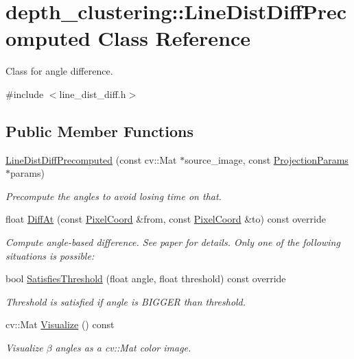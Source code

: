 \hypertarget{classdepth__clustering_1_1LineDistDiffPrecomputed}{\section{depth\-\_\-clustering\-:\-:Line\-Dist\-Diff\-Precomputed Class Reference}
\label{classdepth__clustering_1_1LineDistDiffPrecomputed}
}


Class for angle difference.  




{\ttfamily \#include $<$line\-\_\-dist\-\_\-diff.\-h$>$}

\subsection*{Public Member Functions}
\begin{DoxyCompactItemize}
\item 
\hyperlink{classdepth__clustering_1_1LineDistDiffPrecomputed_a035909e1718ad9b54b9b4116bbb6c408}{Line\-Dist\-Diff\-Precomputed} (const cv\-::\-Mat $\ast$source\-\_\-image, const \hyperlink{classdepth__clustering_1_1ProjectionParams}{Projection\-Params} $\ast$params)
\begin{DoxyCompactList}\small\item\em Precompute the angles to avoid losing time on that. \end{DoxyCompactList}\item 
float \hyperlink{classdepth__clustering_1_1LineDistDiffPrecomputed_ac505afaa537656af1bcc342ab1e910c4}{Diff\-At} (const \hyperlink{structdepth__clustering_1_1PixelCoord}{Pixel\-Coord} \&from, const \hyperlink{structdepth__clustering_1_1PixelCoord}{Pixel\-Coord} \&to) const override
\begin{DoxyCompactList}\small\item\em Compute angle-\/based difference. See paper for details. Only one of the following situations is possible\-: \end{DoxyCompactList}\item 
\hypertarget{classdepth__clustering_1_1LineDistDiffPrecomputed_ac3ce8196d5e6f49f3e3bdc3e3b32b033}{bool \hyperlink{classdepth__clustering_1_1LineDistDiffPrecomputed_ac3ce8196d5e6f49f3e3bdc3e3b32b033}{Satisfies\-Threshold} (float angle, float threshold) const override}\label{classdepth__clustering_1_1LineDistDiffPrecomputed_ac3ce8196d5e6f49f3e3bdc3e3b32b033}

\begin{DoxyCompactList}\small\item\em Threshold is satisfied if angle is B\-I\-G\-G\-E\-R than threshold. \end{DoxyCompactList}\item 
cv\-::\-Mat \hyperlink{classdepth__clustering_1_1LineDistDiffPrecomputed_ae06f8b4dd6330730849725c1b1f20b43}{Visualize} () const 
\begin{DoxyCompactList}\small\item\em Visualize $\beta$ angles as a {\ttfamily cv\-::\-Mat} color image. \end{DoxyCompactList}\end{DoxyCompactItemize}
